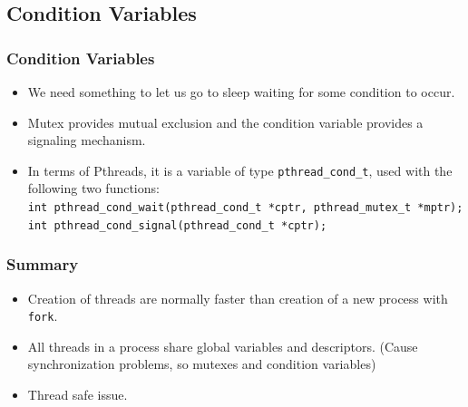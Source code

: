 \documentclass[notes,serif]{beamer}
\begin{document}
\subsection{Condition Variables}
\begin{frame}[containsverbatim]
  \frametitle{Condition Variables}
  \begin{itemize}
    \item We need something to let us go to sleep waiting for some condition to occur.
    \item Mutex provides mutual exclusion and the condition variable provides a signaling mechanism.
    \item In terms of Pthreads, it is a variable of type \texttt{pthread\_cond\_t}, used with the following two functions: \\
        {\tiny
      \verb+int pthread_cond_wait(pthread_cond_t *cptr, pthread_mutex_t *mptr);+
      \verb+int pthread_cond_signal(pthread_cond_t *cptr);+
      }
  \end{itemize}
\end{frame}

\begin{frame}
  \frametitle{Summary}
  \begin{itemize}
    \item Creation of threads are normally faster than creation of a new process with \texttt{fork}.
    \item All threads in a process share global variables and descriptors.  (Cause synchronization problems, so mutexes and condition variables)
    \item Thread safe issue.
  \end{itemize}
\end{frame}
\end{document}
